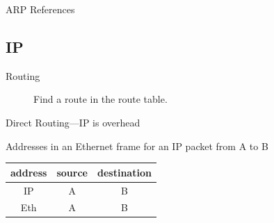 \begin{frame}{ARP References}
  \begin{refsection}
  \nocite{wiki:arp, rfc826} \printbibliography[heading=none]
\end{refsection}
\end{frame}

\subsection{IP}

\begin{frame}
  \begin{minipage}{.45\linewidth}
    \begin{center}
    \end{center}
  \end{minipage}\hfill
  \begin{minipage}{.45\linewidth}
    \begin{center}
      \label{fig:router}
    \end{center}
  \end{minipage}
  \begin{description}
  \item[Routing] Find a route in the route table.
  \end{description}
\end{frame}

\begin{frame}{Direct Routing---IP is overhead}
    \begin{center}
    \end{center}
  \begin{iblock}{Addresses in an Ethernet frame for an IP packet from A to B}
    \begin{center}
      \begin{tabular}{ccc}
        \toprule
        address & source & destination\\\midrule
        IP & A & B\\
        Eth & A & B\\\bottomrule
      \end{tabular}
    \end{center}
  \end{iblock}
\end{frame}

